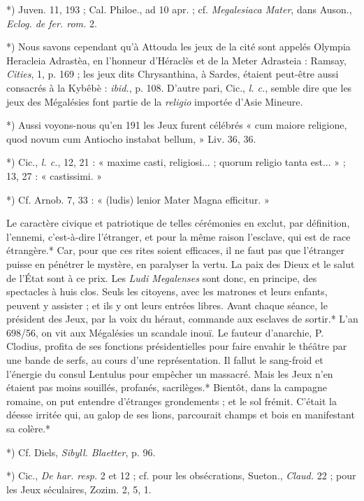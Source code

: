 \documentclass[a4paper, 11pt, oneside, polutonikogreek, french]{article}
\begin{document}
*) Juven. 11, 193 ; Cal. Philoe., ad 10 apr. ; cf. \emph{Megalesiaca Mater}, dans Auson., \emph{Eclog. de fer. rom.} 2.

*) Nous savons cependant qu'à Attouda les jeux de la cité sont appelés Olympia Heracleia Adrastèa, en l'honneur d'Héraclès et de la Meter Adrasteia : Ramsay, \emph{Cities}, 1, p. 169 ; les jeux dits Chrysanthina, à Sardes, étaient peut-être aussi consacrés à la Kybêbè : \emph{ibid.}, p. 108. D'autre pari, Cic., \emph{l. c.}, semble dire que les jeux des Mégalésies font partie de la \emph{religio} importée d'Asie Mineure.

*) Aussi voyons-nous qu'en 191 les Jeux furent célébrés « cum maiore religione, quod novum cum Antiocho instabat bellum, » Liv. 36, 36.

*) Cic., \emph{l. c.}, 12, 21 : « maxime casti, religiosi... ; quorum religio tanta est... » ; 13, 27 : « castissimi. »

*) Cf. Arnob. 7, 33 : « (ludis) lenior Mater Magna efficitur. »

Le caractère civique et patriotique de telles cérémonies en exclut, par définition, l'ennemi, c'est-à-dire l'étranger, et pour la même raison l'esclave, qui est de race étrangère.* Car, pour que ces rites soient efficaces, il ne faut pas que l'étranger puisse en pénétrer le mystère, en paralyser la vertu. La paix des Dieux et le salut de l'État sont à ce prix. Les \emph{Ludi Megalenses} sont donc, en principe, des spectacles à huis clos. Seuls les citoyens, avec les matrones et leurs enfants, peuvent y assister ; et ils y ont leurs entrées libres. Avant chaque séance, le président des Jeux, par la voix du héraut, commande aux esclaves de sortir.* L'an 698/56, on vit aux Mégalésies un scandale inouï. Le fauteur d'anarchie, P. Clodius, profita de ses fonctions présidentielles pour faire envahir le théâtre par une bande de serfs, au cours d'une représentation. Il fallut le sang-froid et l'énergie du consul Lentulus pour empêcher un massacré. Mais les Jeux n'en étaient pas moins souillés, profanés, sacrilèges.* Bientôt, dans la campagne romaine, on put entendre d'étranges grondements ; et le sol frémit. C'était la déesse irritée qui, au galop de ses lions, parcourait champs et bois en manifestant sa colère.*

*) Cf. Diels, \emph{Sibyll. Blaetter}, p. 96.

*) Cic., \emph{De har. resp.} 2 et 12 ; cf. pour les obsécrations, Sueton., \emph{Claud.} 22 ; pour les Jeux séculaires, Zozim. 2, 5, 1.
\end{document}
